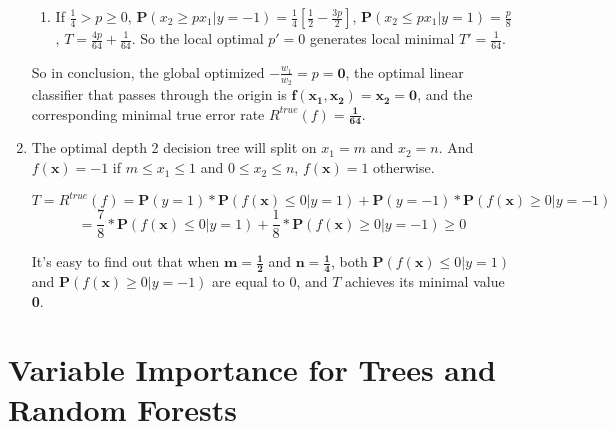 \documentclass[paper=letter, fontsize=12pt]{article}
\begin{document}
\begin{enumerate}[label=(\alph*)]
\begin{enumerate}[label=(\roman*)]
		\item If $\frac{1}{4} > p \geq 0$, $\mathbf{P}(x_2 \geq p x_1 | y = -1) = \frac{1}{4}[\frac{1}{2} - 
		\frac{3p}{2}]$, $\mathbf{P}(x_2 \leq p x_1 | y = 1) = \frac{p}{8}$, $T = \frac{4p}{64} + \frac{1}{64}$. So the local optimal $p' = 0 $ generates local minimal $T' = \frac{1}{64}$.
	\end{enumerate}

	So in conclusion, the global optimized $-\frac{w_1}{w_2} = p = \mathbf{0}$, the optimal linear classifier that passes through the origin is $\mathbf{f(x_1, x_2) = x_2 = 0}$, and the corresponding minimal true error rate $R^{true}(f) = \mathbf{\frac{1}{64}}$.
	
	\item The optimal depth 2 decision tree will split on $x_1 = m$ and $x_2 = n$. And $f(\mathbf{x}) = -1$ if $m \leq x_1 \leq 1$ and $0 \leq x_2 \leq n$, $f(\mathbf{x}) = 1$ otherwise.
	
	\begin{equation}
	T = R^{true}(f) = \mathbf{P}(y = 1) * \mathbf{P}(f(\mathbf{x}) \leq 0 | y = 1) + \mathbf{P}(y = -1) * \mathbf{P}(f(\mathbf{x}) \geq 0 | y = -1)
	\end{equation}
	\begin{equation}
	= \frac{7}{8} * \mathbf{P}(f(\mathbf{x}) \leq 0 | y = 1) + \frac{1}{8} * \mathbf{P}(f(\mathbf{x}) \geq 0 | y = -1) \geq 0
	\end{equation}
	
	It's easy to find out that when $\mathbf{m = \frac{1}{2}}$ and $\mathbf{n = \frac{1}{4}}$, both $\mathbf{P}(f(\mathbf{x}) \leq 0 | y = 1)$ and $\mathbf{P}(f(\mathbf{x}) \geq 0 | y = -1) $ are equal to 0, and $T$ achieves its minimal value \textbf{0}.
	
\end{enumerate}

\section{Variable Importance for Trees and Random Forests}
\end{document}
